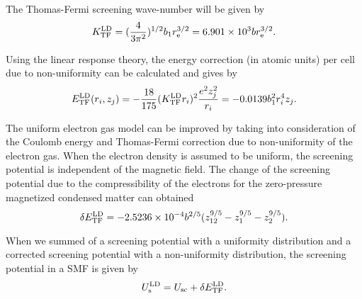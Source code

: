 \documentclass[manuscript]{aastex}
\begin{document}
The Thomas-Fermi screening wave-number will be given by
\begin{equation}
K_{\rm{TF}}^{\rm{LD}}=(\frac{4}{3\pi^2})^{1/2}b_1r_{\rm{e}}^{3/2}=6.901\times10^3br_{\rm{e}}^{3/2}.
\label{24}
\end{equation}

Using the linear response theory, the energy correction (in atomic
units) per cell due to non-uniformity can be calculated and gives by
\citep{Lai01}
\begin{equation}
E_{\rm{TF}}^{\rm{LD}}(r_{i},z_{j})=-\frac{18}{175}(K_{\rm{TF}}^{\rm{LD}}r_{i})^2\frac{e^2z_{j}^2}{r_{i}}=-0.0139b_1^2r_{i}^4z_{j}.
\label{25}
\end{equation}

The uniform electron gas model can be improved by taking into
consideration of the Coulomb energy and Thomas-Fermi correction due
to non-uniformity of the electron gas. When the electron density is
assumed to be uniform, the screening potential is independent of the
magnetic field. The change of the screening potential due to the
compressibility of the electrons for the zero-pressure magnetized
condensed matter can obtained
\begin{equation}
 \delta
 E_{\rm{TF}}^{\rm{LD}}=-2.5236\times10^{-4}b^{2/5}(z_{12}^{9/5}-z_{1}^{9/5}-z_{2}^{9/5}).
\label{26}
\end{equation}

When we summed of a screening potential with a uniformity
distribution and a corrected screening potential with a
non-uniformity distribution, the screening potential in a SMF is
given by
\begin{equation}
U_{\rm{s}}^{\rm{LD}}=U_{\rm{sc}}+\delta E_{\rm{TF}}^{\rm{LD}}.
\label{27}
\end{equation}
\end{document}
